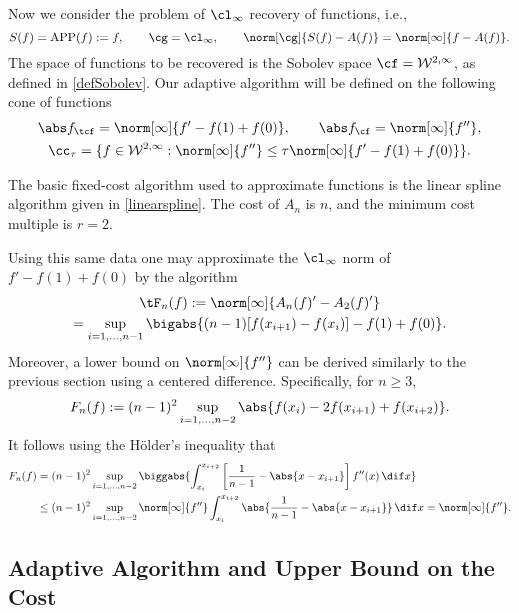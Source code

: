 Now we consider the problem of $\cl_{\infty}$ recovery of functions, i.e.,
\[
S(f)=\APP(f):=f, \qquad \cg=\cl_{\infty}, \qquad \norm[\cg]{S(f)-A(f)}=\norm[\infty]{f-A(f)}.
\]
The space of functions to be recovered is the Sobolev space $\cf = \mathcal{W}^{2,\infty}$, as defined in \eqref{defSobolev}.  Our adaptive algorithm will be defined on the following cone of functions
\begin{subequations} \label{coneappxdef}
\begin{gather}
\Ftnorm{f}=\norm[\infty]{f'-f(1)+f(0)}, \qquad \Fnorm{f}=\norm[\infty]{f''}, \\
\cc_{\tau}=\{f \in  \mathcal{W}^{2,\infty} : \norm[\infty]{f''}\leq \tau\norm[\infty]{f'-f(1)+f(0)}\}.
\end{gather}
\end{subequations}

The basic fixed-cost algorithm used to approximate functions is the linear spline algorithm given in \eqref{linearspline}.
The cost of $A_n$ is $n$, and the minimum cost multiple is $r=2$.

Using this same data one may approximate the $\cl_\infty$ norm of $f'-f(1)+f(0)$ by the algorithm
\begin{multline}\label{estfirstderiv}
\tF_n(f) := \norm[\infty]{A_n(f)' - A_2(f)'} \\
= \sup_{i=1, \ldots, n-1} \bigabs{(n-1) [f(x_{i+1})-f(x_i)]-f(1)+f(0)}.
\end{multline}
Moreover, a lower bound on $\norm[\infty]{f''}$ can be derived similarly to the previous section using a centered difference.  Specifically, for $n \ge 3$,
\begin{equation} \label{Fnormappxalg}
F_n(f) := (n-1)^2\sup_{i=1, \ldots, n-2} \abs{f(x_i) - 2 f(x_{i+1})+f(x_{i+2})}.
\end{equation}
It follows using the H\"older's inequality that
\begin{align*}
F_n(f) &= (n-1)^2\sup_{i=1, \ldots, n-2} \biggabs{\int_{x_i}^{x_{i+2}} \left[\frac{1}{n-1} - \abs{x-x_{i+1}}\right] f''(x) \, \dif x} \\
&\le (n-1)^2\sup_{i=1, \ldots, n-2} \norm[\infty]{f''} \int_{x_i}^{x_{i+2}} \abs{\frac{1}{n-1} - \abs{x-x_{i+1}}} \, \dif x = \norm[\infty]{f''}.
\end{align*}

\subsection{Adaptive Algorithm and Upper Bound on the Cost}


